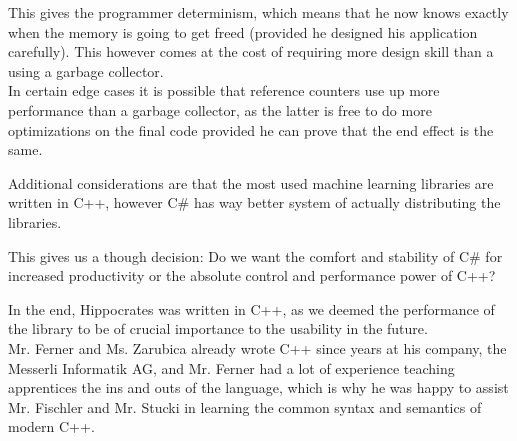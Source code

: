 This gives the programmer determinism, which means that he now knows exactly when the memory is going to get freed (provided he designed his application carefully). This however comes at the cost of requiring more design skill than a using a garbage collector.\\
In certain edge cases it is possible that reference counters use up more performance than a garbage collector, as the latter is free to do more optimizations on the final code provided he can prove that the end effect is the same.
 
Additional considerations are that the most used machine learning libraries are written in C++, however C\# has way better system of actually distributing the libraries. 

This gives us a though decision: Do we want the comfort and stability of C\# for increased productivity or the absolute control and performance power of C++?

In the end, Hippocrates was written in C++, as we deemed the performance of the library to be of crucial importance to the usability in the future.\\
Mr. Ferner and Ms. Zarubica already wrote C++ since years at his company, the Messerli Informatik AG, and Mr. Ferner had a lot of experience teaching apprentices the ins and outs of the language, which is why he was happy to assist Mr. Fischler and Mr. Stucki in learning the common syntax and semantics of modern C++.